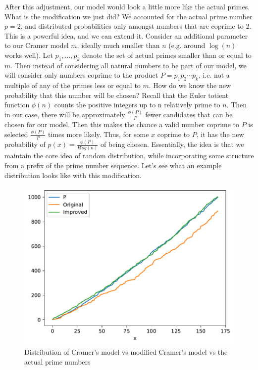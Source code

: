 \documentclass[conference]{IEEEtran}
\begin{document}
After this adjustment, our model would look a little more like the actual primes. What is the modification we just did? We accounted for the actual prime number $p = 2$, and distributed probabilities only amongst numbers that are coprime to 2. This is a powerful idea, and we can extend it. Consider an additional parameter to our Cramer model $m$, ideally much smaller than $n$ (e.g. around $\log(n)$\cite{b1} works well). Let $p_1, \dots, p_k$ denote the set of actual primes smaller than or equal to $m$. Then instead of considering all natural numbers to be part of our model, we will consider only numbers coprime to the product $P = p_1p_2\cdots p_k$, i.e. not a multiple of any of the primes less or equal to $m$. How do we know the new probability that this number will be chosen? Recall that the Euler totient function $\phi(n)$ counts the positive integers up to n relatively prime to $n$. Then in our case, there will be approximately $\frac{\phi(P)}{P}$ fewer candidates that can be chosen for our model. Then this makes the chance a valid number coprime to $P$ is selected $\frac{\phi(P)}{P}$ times more likely. Thus, for some $x$ coprime to $P$, it has the new probability of $p(x) = \frac{\phi(P)}{Plog(n)}$ of being chosen. Essentially, the idea is that we maintain the core idea of random distribution, while incorporating some structure from a prefix of the prime number sequence. Let's see what an example distribution looks like with this modification.

\begin{figure}[H]
  \centering
  \includegraphics[width=\linewidth,keepaspectratio]{../images/Improvement.pdf}
  \caption{Distribution of Cramer's model vs modified Cramer's model vs the actual prime numbers}
\end{figure}
\end{document}
